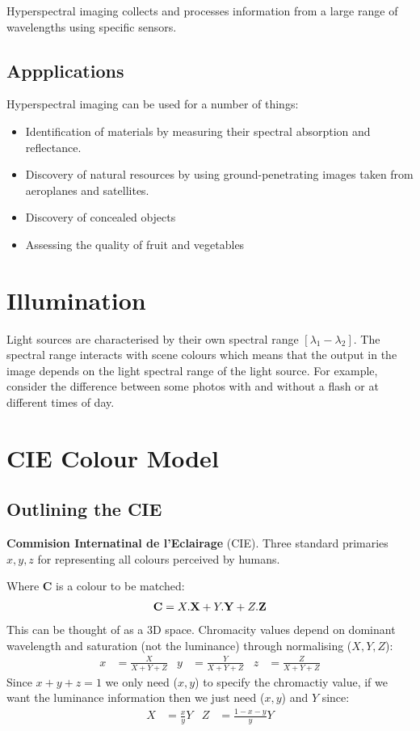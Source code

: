 \documentclass{article}
\begin{document}
Hyperspectral imaging collects and processes information from a large range of wavelengths using specific sensors. %

\subsection{Appplications}
Hyperspectral imaging can be used for a number of things:
\begin{itemize}
	\item Identification of materials by measuring their spectral absorption and reflectance.
	\item Discovery of natural resources by using ground-penetrating images taken from aeroplanes and satellites.
	\item Discovery of concealed objects
	\item Assessing the quality of fruit and vegetables
\end{itemize}

\section{Illumination}
Light sources are characterised by their own spectral range $[\lambda_1-\lambda_2]$.
The spectral range interacts with scene colours which means that the output in the image depends on the light spectral range of the light source.
For example, consider the difference between some photos with and without a flash or at different times of day.

\section{CIE Colour Model}
\subsection{Outlining the CIE}
{\bf Commision Internatinal de l'Eclairage} (CIE).
Three standard primaries $x,y,z$ for representing all colours perceived by humans.

Where {\bf C} is a colour to be matched: 
\begin{align*}
	{\bf C} = X.{\bf X} + Y.{\bf Y} + Z.{\bf Z} 
\end{align*}
This can be thought of as a 3D space.
Chromacity values depend on dominant wavelength and saturation (not the luminance) through normalising ($X,Y,Z$):
\begin{align*}
	x &= \frac{X}{X+Y+Z} & y &= \frac{Y}{X+Y+Z} & z &= \frac{Z}{X+Y+Z}
\end{align*}
Since $x + y + z = 1$ we only need ($x,y$) to specify the chromactiy value, if we want the luminance information then we just need ($x,y$) and $Y$ since:
\begin{align*}
	X &= \frac{x}{y}Y & Z &= \frac{1-x-y}{y}Y
\end{align*}
\end{document}
